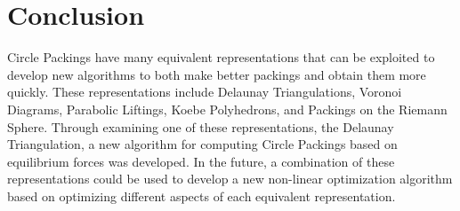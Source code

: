 \documentclass[11pt]{article}
\theoremstyle{definition}
\begin{document}
\section{Conclusion}

	Circle Packings have many equivalent representations that can be exploited to develop new algorithms to both make better packings and obtain them more quickly. 
	These representations include Delaunay Triangulations, Voronoi Diagrams, Parabolic Liftings, Koebe Polyhedrons, and Packings on the Riemann Sphere. 
	Through examining one of these representations, the Delaunay Triangulation, a new algorithm for computing Circle Packings based on equilibrium forces was developed. 
	In the future, a combination of these representations could be used to develop a new non-linear optimization algorithm based on optimizing different aspects of each equivalent representation.



\end{document}
